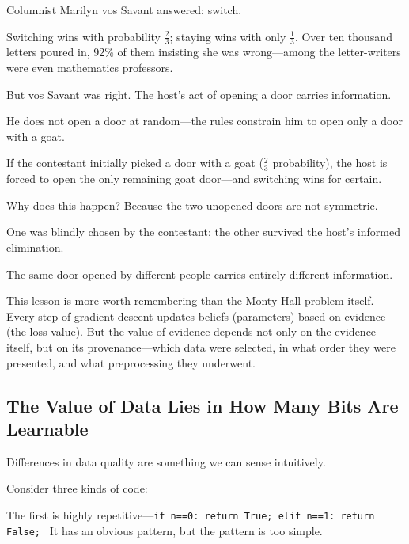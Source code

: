 \vspace{1em}


Columnist Marilyn vos Savant answered: switch.

Switching wins with probability $\frac{2}{3}$; staying wins with only $\frac{1}{3}$.
Over ten thousand letters poured in, 92\% of them insisting she was wrong---among the letter-writers were even mathematics professors.

\vspace{1em}

But vos Savant was right. The host's act of opening a door carries information.

He does not open a door at random---the rules constrain him to open only a door with a goat.

If the contestant initially picked a door with a goat ($\frac{2}{3}$ probability), the host is forced to open the only remaining goat door---and switching wins for certain.

\vspace{1em}

Why does this happen? Because the two unopened doors are not symmetric.

One was blindly chosen by the contestant; the other survived the host's informed elimination.

The same door opened by different people carries entirely different information.

\vspace{1em}

This lesson is more worth remembering than the Monty Hall problem itself. Every step of gradient descent updates beliefs (parameters) based on evidence (the loss value). But the value of evidence depends not only on the evidence itself, but on its provenance---which data were selected, in what order they were presented, and what preprocessing they underwent.

\subsection{The Value of Data Lies in How Many Bits Are Learnable}

Differences in data quality are something we can sense intuitively.

\vspace{1em}

Consider three kinds of code:

The first is highly repetitive---\texttt{if n==0: return True; elif n==1: return False; } It has an obvious pattern, but the pattern is too simple.

